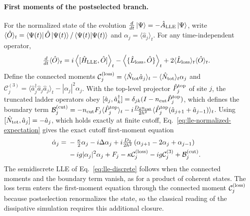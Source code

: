 \documentclass[pra,twocolumn,superscriptaddress,nofootinbib,floatfix]{revtex4-2}
\theoremstyle{remark}
\begin{document}
\paragraph{First moments of the postselected branch.}
For the normalized state of the evolution \(\tfrac{d}{dt}\ket{\Psi}=-\hat A_{\rm LLE}\ket{\Psi}\), write \(\langle\hat O\rangle_t=\bra{\Psi(t)}\hat O\ket{\Psi(t)}/\braket{\Psi(t)}{\Psi(t)}\) and \(\alpha_j=\langle\hat a_j\rangle_t\). For any time-independent operator,
\begin{align}
\tfrac{d}{dt}\langle\hat O\rangle_t= i\left\langle [\hat H_{\rm LLE},\hat O]\right\rangle_t - \left\langle\{\hat L_{\rm loss},\hat O\}\right\rangle_t+ 2\langle\hat L_{\rm loss}\rangle_t \langle\hat O\rangle_t .
\label{eq:lle-normalized-expectation}
\end{align}
Define the connected moments
\(\mathcal C_{j}^{({\rm loss})}=\langle \hat N_{\rm tot}\hat a_j\rangle_t-\langle \hat N_{\rm tot}\rangle_t \alpha_j\) and \(\mathcal C_j^{(3)} = \langle \hat a_j^\dagger\hat a_j\hat a_j \rangle_t - |\alpha_j|^2\alpha_j\).
With the top-level projector \(\hat P_j^{\rm top}\) of site \(j\), the truncated ladder operators obey \([\hat a_j,\hat a_k^\dagger]=\delta_{jk}(I-n_{\rm cut}\hat P_j^{\rm top})\), which defines the boundary term
\(\mathcal B_j^{({\rm cut})}=-n_{\rm cut}F_j\langle\hat P_j^{\rm top}\rangle_t-i\tfrac{D_2n_{\rm cut}}{2h^2}\langle\hat P_j^{\rm top}(\hat a_{j+1}+\hat a_{j-1})\rangle_t\).
Using \([\hat N_{\rm tot},\hat a_j]=-\hat a_j\), which holds exactly at finite cutoff, Eq.~\eqref{eq:lle-normalized-expectation} gives the exact cutoff first-moment equation
\begin{align}
\dot\alpha_j={}& -\tfrac{\kappa}{2}\alpha_j -i\Delta\alpha_j +i\tfrac{D_2}{2h^2}\left( \alpha_{j+1}-2\alpha_j+\alpha_{j-1} \right)\nonumber\\
&-ig|\alpha_j|^2\alpha_j +F_j - \kappa\mathcal C_j^{({\rm loss})} -ig\mathcal C_j^{(3)} + \mathcal B_j^{({\rm cut})}.
\label{eq:lle-first-moment-exact}
\end{align}
The semidiscrete LLE of Eq.~\eqref{eq:lle-discrete} follows when the connected moments and the boundary term vanish, as for a product of coherent states. The loss term enters the first-moment equation through the connected moment \(\mathcal C_j^{({\rm loss})}\) because postselection renormalizes the state, so the classical reading of the dissipative simulation requires this additional closure.
\end{document}
